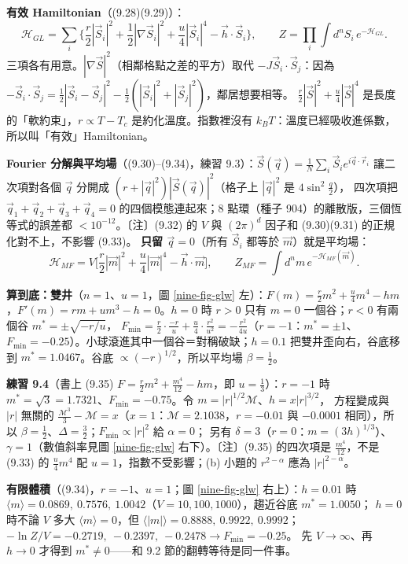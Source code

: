 \textbf{有效 Hamiltonian}（(9.28)(9.29)）：
\[\mathcal H_{GL}=\sum_i\Big\{\frac r2|\vec S_i|^2+\frac12|\nabla\vec S_i|^2+\frac u4|\vec S_i|^4-\vec h\cdot\vec S_i\Big\},\qquad Z=\prod_i\int d^nS_i\,e^{-\mathcal H_{GL}}.\tag{9.28, 9.29}\]
三項各有用意。$|\nabla\vec S|^2$（相鄰格點之差的平方）取代 $-J\vec S_i\cdot\vec S_j$：因為 $-\vec S_i\cdot\vec S_j=\frac12|\vec S_i-\vec S_j|^2-\frac12(|\vec S_i|^2+|\vec S_j|^2)$，鄰居想要相等。
$\frac r2|\vec S|^2+\frac u4|\vec S|^4$ 是長度的「軟約束」，$r\propto T-T_c$ 是約化溫度。指數裡沒有 $k_BT$：溫度已經吸收進係數，所以叫「有效」Hamiltonian。

\textbf{Fourier 分解與平均場}（(9.30)--(9.34)，練習 9.3）：$\vec S(\vec q)=\frac1N\sum_i\vec S_ie^{i\vec q\cdot\vec r_i}$ 讓二次項對各個 $\vec q$ 分開成 $(r+|\vec q|^2)|\vec S(\vec q)|^2$（格子上 $|\vec q|^2$ 是 $4\sin^2\frac q2$），
四次項把 $\vec q_1+\vec q_2+\vec q_3+\vec q_4=0$ 的四個模態連起來；8 點環（種子 904）的離散版，三個恆等式的誤差都 $<10^{-12}$。〔注〕(9.32) 的 $V$ 與 $(2\pi)^d$ 因子和 (9.30)(9.31) 的正規化對不上，不影響 (9.33)。
\textbf{只留 $\vec q=0$}（所有 $\vec S_i$ 都等於 $\vec m$）就是平均場：
\[\mathcal H_{MF}=V\Big[\frac r2|\vec m|^2+\frac u4|\vec m|^4-\vec h\cdot\vec m\Big],\qquad Z_{MF}=\int d^nm\,e^{-\mathcal H_{MF}(\vec m)}.\tag{9.33, 9.34}\]

\textbf{算到底：雙井}（$n=1$、$u=1$，圖 \ref{nine-fig-glw} 左）：$F(m)=\frac r2m^2+\frac u4m^4-hm$，$F'(m)=rm+um^3-h=0$。$h=0$ 時 $r>0$ 只有 $m=0$ 一個谷；$r<0$ 有兩個谷 $m^*=\pm\sqrt{-r/u}$，
$F_{\min}=\frac r2\cdot\frac{-r}u+\frac u4\cdot\frac{r^2}{u^2}=-\frac{r^2}{4u}$（$r=-1$：$m^*=\pm1$、$F_{\min}=-0.25$）。小球滾進其中一個谷＝對稱破缺；$h=0.1$ 把雙井歪向右，谷底移到 $m^*=1.0467$。谷底 $\propto(-r)^{1/2}$，所以平均場 $\beta=\frac12$。

\textbf{練習 9.4}（書上 (9.35) $F=\frac r2m^2+\frac{m^4}{12}-hm$，即 $u=\frac13$）：$r=-1$ 時 $m^*=\sqrt3=1.7321$、$F_{\min}=-0.75$。令 $m=|r|^{1/2}\mathcal M$、$h=x|r|^{3/2}$，
方程變成與 $|r|$ 無關的 $\frac{\mathcal M^3}3-\mathcal M=x$（$x=1$：$\mathcal M=2.1038$，$r=-0.01$ 與 $-0.0001$ 相同），所以 $\beta=\frac12$、$\Delta=\frac32$；$F_{\min}\propto|r|^2$ 給 $\alpha=0$；
另有 $\delta=3$（$r=0$：$m=(3h)^{1/3}$）、$\gamma=1$（數值斜率見圖 \ref{nine-fig-glw} 右下）。〔注〕(9.35) 的四次項是 $\frac{m^4}{12}$，不是 (9.33) 的 $\frac u4m^4$ 配 $u=1$，指數不受影響；(b) 小題的 $r^{2-\alpha}$ 應為 $|r|^{2-\alpha}$。

\textbf{有限體積}（(9.34)，$r=-1$、$u=1$；圖 \ref{nine-fig-glw} 右上）：$h=0.01$ 時 $\langle m\rangle=0.0869,\ 0.7576,\ 1.0042$（$V=10,100,1000$），趨近谷底 $m^*=1.0050$；
$h=0$ 時不論 $V$ 多大 $\langle m\rangle=0$，但 $\langle|m|\rangle=0.8888,\ 0.9922,\ 0.9992$；$-\ln Z/V=-0.2719,\ -0.2397,\ -0.2478\to F_{\min}=-0.25$。
先 $V\to\infty$、再 $h\to0$ 才得到 $m^*\ne0$——和 9.2 節的翻轉等待是同一件事。

